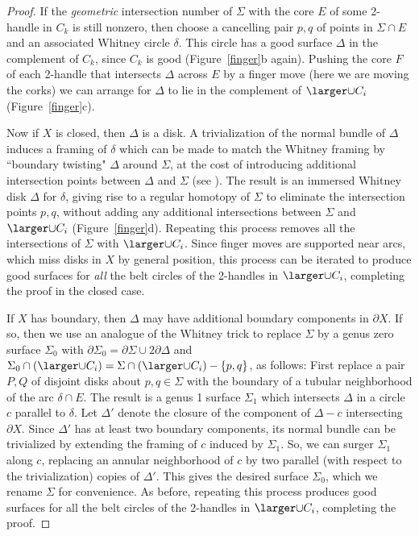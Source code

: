 \documentclass[11pt]{amsart}
\theoremstyle{definition}
\newcommand{\figref}[1]{Figure~\ref{#1}}
\newcommand{\del}{\partial}
\begin{document}
\begin{proof}

If the {\sl geometric} intersection number of $\Sigma$ with the core $E$ of some 2-handle in $C_k$ is still nonzero, then choose a cancelling pair $p,q$ of points in $\Sigma\cap E$ and an associated Whitney circle $\delta$.  This circle has a good surface $\Delta$ in the complement of $C_k$, since $C_k$ is good (\figref{finger}b again).  Pushing the core $F$ of each 2-handle that intersects $\Delta$ across $E$ by a finger move (here we are moving the corks) we can arrange for $\Delta$ to lie in the complement of $\Q$ (\figref{finger}c).

Now if $X$ is closed, then $\Delta$ is a disk.  A trivialization of the normal bundle of $\Delta$ induces a framing of $\delta$ which can be made to match the Whitney framing by ``boundary twisting"  $\Delta$ around $\Sigma$, at the cost of introducing additional intersection points between $\Delta$ and $\Sigma$ (see \cite[\S1.3--1.4]{freedman-quinn:4-manifolds}).  The result is an immersed Whitney disk $\Delta$ for $\delta$, giving rise to a regular homotopy of $\Sigma$ to eliminate the intersection points $p,q$, without adding any additional intersections between $\Sigma$ and $\Q$ (\figref{finger}d).  Repeating this process removes all the intersections of $\Sigma$ with $\Q$.  Since finger moves are supported near arcs, which miss disks in $X$ by general position, this process can be iterated to produce good surfaces for {\sl all} the belt circles of the 2-handles in $\Q$, completing the proof in the closed case.

If $X$ has boundary, then $\Delta$ may have additional boundary components in $\del X$.  If so, then we use an analogue of the Whitney trick to replace $\Sigma$ by a genus zero surface $\Sigma_0$ with $\del\Sigma_0 = \del\Sigma\cup2\del\Delta$ and $\Sigma_0\cap(\Q) = \Sigma\cap(\Q)-\{p,q\}$, as follows:  First replace a pair $P,Q$ of disjoint disks about $p,q\in\Sigma$ with the boundary of a tubular neighborhood of the arc $\delta\cap E$.  The result is a genus 1 surface $\Sigma_1$ which intersects $\Delta$ in a circle $c$ parallel to $\delta$.  Let $\Delta'$ denote the closure of the component of $\Delta - c$ intersecting $\del X$. Since $\Delta'$ has at least two boundary components, its normal bundle can be trivialized by extending the framing of $c$ induced by $\Sigma_1$. So, we can surger $\Sigma_1$ along $c$, replacing an annular neighborhood of $c$ by two parallel (with respect to the trivialization) copies of $\Delta'$.  This gives the desired surface $\Sigma_0$, which we rename $ \Sigma$ for convenience.  As before, repeating this process produces good surfaces for all the belt circles of the 2-handles in $\Q$, completing the proof. 
\end{proof}
\end{document}
